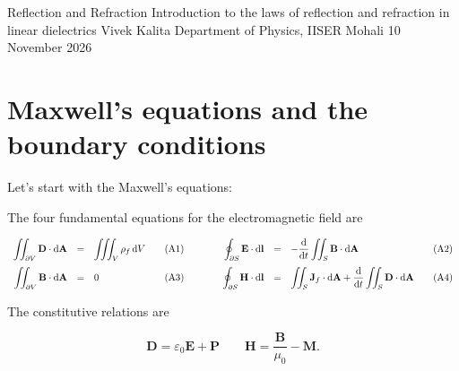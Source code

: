 \documentclass[10pt,a4paper]{article}
\begin{document}
\makemathtitle
    {Reflection and Refraction}
    {Introduction to the laws of reflection and refraction in linear dielectrics}
    {Vivek Kalita}
    {Department of Physics, IISER Mohali}
    {10 November 2026}

\tableofcontents

\section{Maxwell's equations and the boundary conditions}



Let's start with the Maxwell's equations:
\begin{axiom}

The four fundamental equations for the electromagnetic field are

\[
\begin{array}{rcl@{\qquad}l@{\qquad\qquad}rcl@{\qquad}l}
\displaystyle
\iint_{\partial V}\mathbf{D}\cdot\mathrm{d}\mathbf{A}
&=&
\displaystyle\iiint_V\rho_f\,\mathrm{d}V
&\text{(A1)}
&
\displaystyle
\oint_{\partial S}\mathbf{E}\cdot\mathrm{d}\mathbf{l}
&=&
\displaystyle-\frac{\mathrm{d}}{\mathrm{d}t}
\iint_S\mathbf{B}\cdot\mathrm{d}\mathbf{A}
&\text{(A2)}
\\[1.2em]
\displaystyle
\iint_{\partial V}\mathbf{B}\cdot\mathrm{d}\mathbf{A}
&=&0
&\text{(A3)}
&
\displaystyle
\oint_{\partial S}\mathbf{H}\cdot\mathrm{d}\mathbf{l}
&=&
\displaystyle
\iint_S\mathbf{J}_f\cdot\mathrm{d}\mathbf{A}
+\frac{\mathrm{d}}{\mathrm{d}t}
\iint_S\mathbf{D}\cdot\mathrm{d}\mathbf{A}
&\text{(A4)}
\end{array}
\]

The constitutive relations are

\[
\mathbf{D}=\varepsilon_0\mathbf{E}+\mathbf{P}
\qquad
\mathbf{H}=\frac{\mathbf{B}}{\mu_0}-\mathbf{M}.
\]

\end{axiom}
\end{document}
